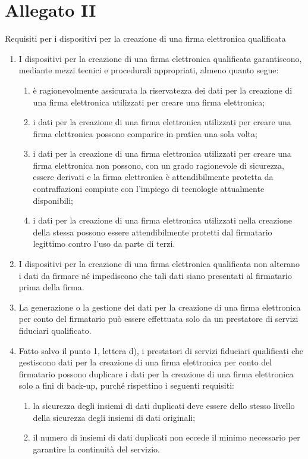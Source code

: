 \section{Allegato II}\label{sec:allegatoIIreg9102014}
Requisiti per i dispositivi per la creazione di una firma elettronica qualificata
\begin{enumerate}
	\item I dispositivi per la creazione di una firma elettronica qualificata garantiscono, mediante mezzi tecnici e procedurali appropriati, almeno quanto segue:
	\begin{enumerate}
		\item 	
		è ragionevolmente assicurata la riservatezza dei dati per la creazione di una firma elettronica utilizzati per creare una firma elettronica;
		\item 	
		i dati per la creazione di una firma elettronica utilizzati per creare una firma elettronica possono comparire in pratica una sola volta;
		\item 	
		i dati per la creazione di una firma elettronica utilizzati per creare una firma elettronica non possono, con un grado ragionevole di sicurezza, essere derivati e la firma elettronica è attendibilmente protetta da contraffazioni compiute con l’impiego di tecnologie attualmente disponibili;
		\item i dati per la creazione di una firma elettronica utilizzati nella creazione della stessa possono essere attendibilmente protetti dal firmatario legittimo contro l’uso da parte di terzi.
	\end{enumerate}
\item I dispositivi per la creazione di una firma elettronica qualificata non alterano i dati da firmare né impediscono che tali dati siano presentati al firmatario prima della firma.
\item La generazione o la gestione dei dati per la creazione di una firma elettronica per conto del firmatario può essere effettuata solo da un prestatore di servizi fiduciari qualificato.
\item Fatto salvo il punto 1, lettera d), i prestatori di servizi fiduciari qualificati che gestiscono dati per la creazione di una firma elettronica per conto del firmatario possono duplicare i dati per la creazione di una firma elettronica solo a fini di back-up, purché rispettino i seguenti requisiti:
\begin{enumerate}
	\item 	
	la sicurezza degli insiemi di dati duplicati deve essere dello stesso livello della sicurezza degli insiemi di dati originali;
	\item 	
	il numero di insiemi di dati duplicati non eccede il minimo necessario per garantire la continuità del servizio.
\end{enumerate}
\end{enumerate}
